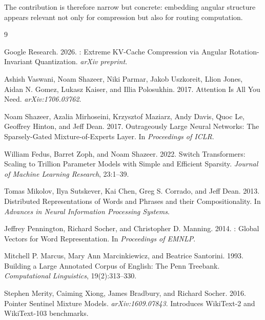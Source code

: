 \documentclass[10pt,twocolumn]{article}
\begin{document}
The contribution is therefore narrow but concrete: embedding angular structure appears relevant not only for compression but also for routing computation.

\begin{thebibliography}{9}

Google Research. 2026.
: Extreme {KV}-Cache Compression via Angular Rotation-Invariant Quantization.
\newblock \emph{arXiv preprint}.

Ashish Vaswani, Noam Shazeer, Niki Parmar, Jakob Uszkoreit, Llion Jones, Aidan N. Gomez, Lukasz Kaiser, and Illia Polosukhin. 2017.
\newblock Attention Is All You Need.
\newblock \emph{arXiv:1706.03762}.

Noam Shazeer, Azalia Mirhoseini, Krzysztof Maziarz, Andy Davis, Quoc Le, Geoffrey Hinton, and Jeff Dean. 2017.
\newblock Outrageously Large Neural Networks: The Sparsely-Gated Mixture-of-Experts Layer.
\newblock In \emph{Proceedings of ICLR}.

William Fedus, Barret Zoph, and Noam Shazeer. 2022.
\newblock Switch Transformers: Scaling to Trillion Parameter Models with Simple and Efficient Sparsity.
\newblock \emph{Journal of Machine Learning Research}, 23:1--39.

Tomas Mikolov, Ilya Sutskever, Kai Chen, Greg S. Corrado, and Jeff Dean. 2013.
\newblock Distributed Representations of Words and Phrases and their Compositionality.
\newblock In \emph{Advances in Neural Information Processing Systems}.

Jeffrey Pennington, Richard Socher, and Christopher D. Manning. 2014.
: Global Vectors for Word Representation.
\newblock In \emph{Proceedings of EMNLP}.

Mitchell P. Marcus, Mary Ann Marcinkiewicz, and Beatrice Santorini. 1993.
\newblock Building a Large Annotated Corpus of English: The Penn Treebank.
\newblock \emph{Computational Linguistics}, 19(2):313--330.

Stephen Merity, Caiming Xiong, James Bradbury, and Richard Socher. 2016.
\newblock Pointer Sentinel Mixture Models.
\newblock \emph{arXiv:1609.07843}. Introduces WikiText-2 and WikiText-103 benchmarks.

\end{thebibliography}
\end{document}
